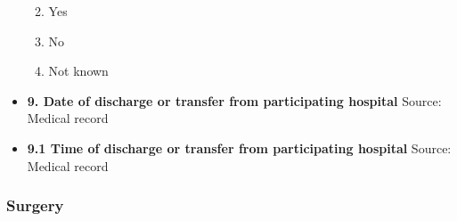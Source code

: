\documentclass[
]{scrartcl}
\providecommand{\tightlist}{%
  \setlength{\itemsep}{0pt}\setlength{\parskip}{0pt}}\usepackage{longtable,booktabs,array}
\begin{document}
\begin{itemize}
  \begin{enumerate}
  \def\labelenumi{\arabic{enumi}.}
  \tightlist
  \item
    Yes
  \item
    No
  \item
    Not known
  \end{enumerate}
\item
  \textbf{9. Date of discharge or transfer from participating hospital}
  Source: Medical record
\item
  \textbf{9.1 Time of discharge or transfer from participating hospital}
  Source: Medical record
\end{itemize}

\hypertarget{surgery}{%
\subsubsection{Surgery}\label{surgery}}
\end{document}
